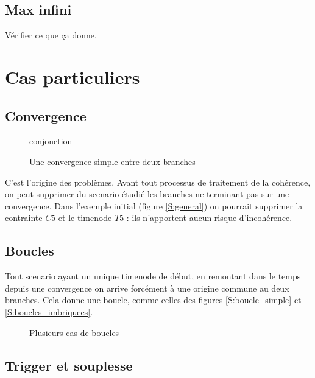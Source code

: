 \documentclass[10pt,a4paper]{article}
\newcommand*{\TikzPath}{../Algo/PropagationTIKZ}%
\begin{document}
	\subsection{Max infini}
	Vérifier ce que ça donne.
	
\section{Cas particuliers}

	\subsection{Convergence}
	\begin{figure}[htp]
		\centering
		
		\schemaScenario conjonction
		\caption{Une convergence simple entre deux branches}
		\label{S:conjonction}
	\end{figure}
C'est l'origine des problèmes. Avant tout processus de traitement de la cohérence, on peut supprimer du scenario étudié les branches ne terminant pas sur une convergence. Dans l'exemple initial (figure \ref{S:general}) on pourrait supprimer la contrainte $C5$ et le timenode $T5$ : ils n'apportent aucun risque d'incohérence.

	\subsection{Boucles}
Tout scenario ayant un unique timenode de début, en remontant dans le temps depuis une convergence on arrive forcément à une origine commune au deux branches. Cela donne une boucle, comme celles des figures \ref{S:boucle_simple} et \ref{S:boucles_imbriquees}.
	
	\begin{figure}[htp]
		\begin{center}
					\hspace{5pt}
			
				\caption{Plusieurs cas de boucles}
		\end{center}
	\end{figure}
	
	\subsection{Trigger et souplesse}
\end{document}
